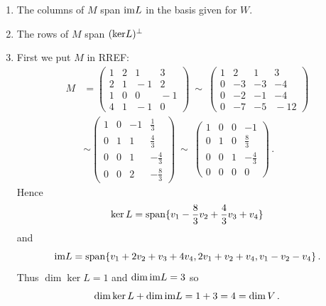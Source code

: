 \begin{enumerate}
\begin{enumerate}
\item The columns of $M$ span ${\rm im} L$ in the basis given for $W$.
\item The rows of $M$ span $({\rm ker}L)^\perp$%
\item First we put $M$ in RREF:
\begin{align*}
M& = \begin{pmatrix}1&2&1&3\\2&1&\!-1&2\\1&0&0&\!-1\\4&1&\!-1&0\end{pmatrix}
\ \sim\
\begin{pmatrix}1&2&1&3\\0&-3&-3&-4\\0&-2&-1&-4\\0&-7&-5&\!-12\end{pmatrix}\\[2mm]
&\sim 
\begin{pmatrix}1&0&-1&\frac13\\[1mm]0&1&1&\frac43\\[1mm]0&0&1&-\frac43\\[1mm]0&0&2&-\frac83\end{pmatrix}
\ \sim\ \begin{pmatrix}1&0&0&-1\\[1mm]0&1&0&\frac83\\[1mm]0&0&1&-\frac43\\[1mm]0&0&0&0\end{pmatrix}\, .
\end{align*}
Hence \[\ker L=\operatorname{span}\{v_1-\frac83v_2+\frac43 v_3+v_4\}\] and \[{\rm im} L=\operatorname{span}\{v_1+2v_2+v_3+4v_4,2v_1+v_2+v_4,v_1-v_2-v_4\}\, .\]
Thus $\dim\ker L=1$ and $\dim{\rm im} L=3$ so \[\dim\ker L+\dim{\rm im} L=1+3=4=\dim V\, .\]
\end{enumerate}


\end{enumerate}
